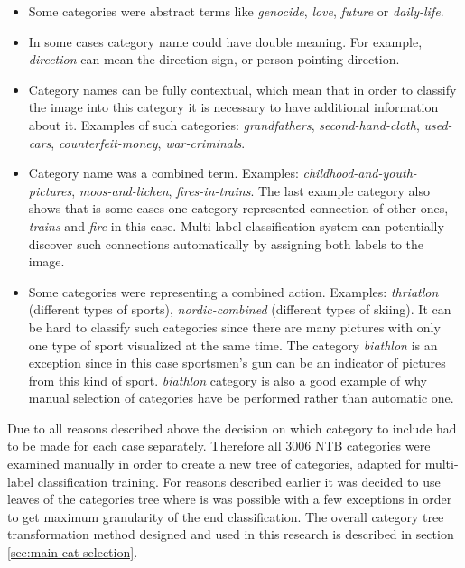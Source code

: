     \begin{itemize}
        \item Some categories were abstract terms like \textit{genocide}, \textit{love}, \textit{future} or \textit{daily-life}.
        \item In some cases category name could have double meaning. For example, \textit{direction} can mean the direction sign, or person pointing direction.
        \item Category names can be fully contextual, which mean that in order to classify the image into this category it is necessary to have additional information about it. Examples of such categories: \textit{grandfathers}, \textit{second-hand-cloth}, \textit{used-cars}, \textit{counterfeit-money}, \textit{war-criminals}.
        \item Category name was a combined term. Examples: \textit{childhood-and-youth-pictures}, \textit{moos-and-lichen}, \textit{fires-in-trains}. The last example category also shows that is some cases one category represented connection of other ones, \textit{trains} and \textit{fire} in this case. Multi-label classification system can potentially discover such connections automatically by assigning both labels to the image.
        \item Some categories were representing a combined action. Examples: \textit{thriatlon} (different types of sports), \textit{nordic-combined} (different types of skiing). It can be hard to classify such categories since there are many pictures with only one type of sport visualized at the same time. The category \textit{biathlon} is an exception since in this case sportsmen's gun can be an indicator of pictures from this kind of sport. \textit{biathlon} category is also a good example of why manual selection of categories have be performed rather than automatic one.
    \end{itemize}
    
    Due to all reasons described above the decision on which category to include had to be made for each case separately. Therefore all 3006 NTB categories were examined manually in order to create a new tree of categories, adapted for multi-label classification training. For reasons described earlier it was decided to use leaves of the categories tree where is was possible with a few exceptions in order to get maximum granularity of the end classification. The overall category tree transformation method designed and used in this research is described in section \ref{sec:main-cat-selection}.
    
